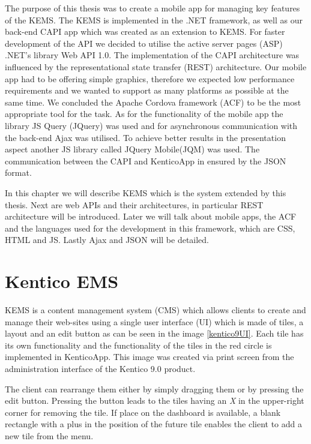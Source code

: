 The purpose of this thesis was to create a mobile app for managing key features of the KEMS. The KEMS is implemented in the .NET framework, as well as our back-end CAPI app which was created as an extension to KEMS. For faster development of the API we decided to utilise the active server pages (ASP) .NET's library Web API 1.0. The implementation of the CAPI architecture was influenced by \linebreak[4] the representational state transfer (REST) architecture. Our mobile app had to be offering simple graphics, therefore we expected low performance requirements and we wanted to support as many platforms as possible at the same time. We concluded the Apache Cordova framework (ACF) to be the most appropriate tool for the task. As for the functionality of the mobile app the library JS Query (JQuery) was used and for asynchronous communication with the back-end Ajax was utilised. To achieve better results in the presentation aspect another JS library called JQuery Mobile(JQM) was used. The communication between the CAPI and KenticoApp in ensured by the JSON format.

In this chapter we will describe KEMS which is the system extended by this thesis. Next are web APIs and their architectures, \linebreak[4] in particular REST architecture will be introduced. Later we will talk about mobile apps, the ACF and the languages used for the development in this framework, which are CSS, HTML and JS. Lastly Ajax and JSON will be detailed. 
\section{Kentico EMS} \label{analysisKenticoCMS}
KEMS \cite{kentico-product-overview} is a content management system (CMS) which allows clients to create and manage their web-sites using a single user interface (UI) which is made of tiles, a layout and an edit button as can be seen in the image \ref{kentico9UI}. Each tile has its own functionality and the functionality of the tiles in the red circle is implemented in KenticoApp. \linebreak[4] This image was created via print screen from the administration interface of the Kentico 9.0 product.

The client can rearrange them either by simply dragging them or by pressing the edit button. Pressing the button leads to the tiles having an \textit{X} in the upper-right corner for removing the tile. If place on the dashboard is available, a blank rectangle with a plus in the position of the future tile enables the client to add a new tile from the menu. 

